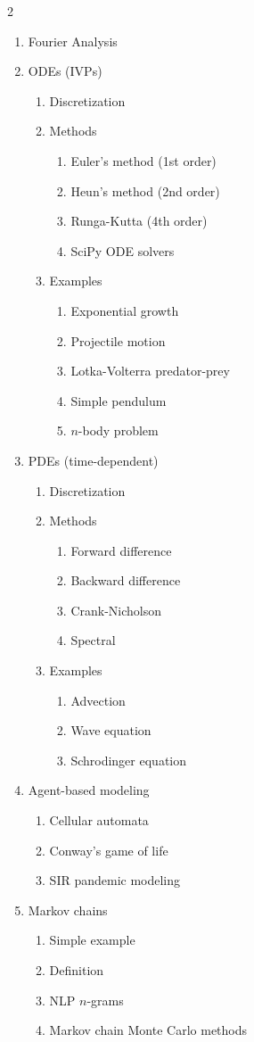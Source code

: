 \documentclass{article}
\begin{document}
\begin{multicols}{2}
\begin{enumerate}
\begin{enumerate}
	\end{enumerate}
	\item Fourier Analysis
	\item ODEs (IVPs)
	\begin{enumerate}
		\item Discretization
		\item Methods
		\begin{enumerate}
			\item Euler's method (1st order)
			\item Heun's method (2nd order)
			\item Runga-Kutta (4th order)
			\item SciPy ODE solvers
		\end{enumerate}
		\item Examples
		\begin{enumerate}
			\item Exponential growth
			\item Projectile motion
			\item Lotka-Volterra predator-prey
			\item Simple pendulum
			\item $n$-body problem
		\end{enumerate}
	\end{enumerate}
	\item PDEs (time-dependent)
	\begin{enumerate}
		\item Discretization
		\item Methods
		\begin{enumerate}
			\item Forward difference
			\item Backward difference
			\item Crank-Nicholson
			\item Spectral
		\end{enumerate}
		\item Examples
		\begin{enumerate}
			\item Advection
			\item Wave equation
			\item Schrodinger equation
		\end{enumerate}
	\end{enumerate}
	\item Agent-based modeling
	\begin{enumerate}
		\item Cellular automata
		\item Conway's game of life
		\item SIR pandemic modeling
	\end{enumerate}
	\item Markov chains
	\begin{enumerate}
		\item Simple example
		\item Definition
		\item NLP $n$-grams
		\item Markov chain Monte Carlo methods
	\end{enumerate}
\end{enumerate}

\end{multicols}
\end{document}
